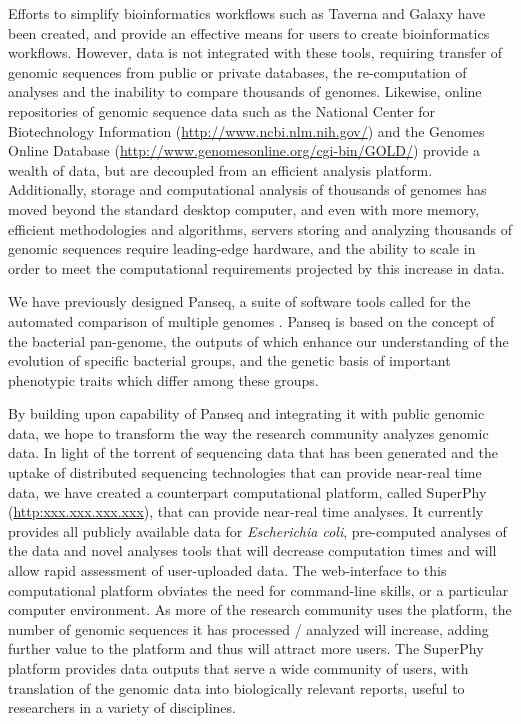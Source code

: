 \documentclass[a4paper,twoside]{article}
\begin{document}
Efforts to simplify bioinformatics workflows such as Taverna \cite{lanzen_taverna_2008} and Galaxy \cite{goecks_galaxy:_2010} have been created, and provide an effective means for users to create bioinformatics workflows. However, data is not integrated with these tools, requiring transfer of genomic sequences from public or private databases, the re-computation of analyses and the inability to compare thousands of genomes. Likewise, online repositories of genomic sequence data such as the National Center for Biotechnology Information (\url{http://www.ncbi.nlm.nih.gov/}) and the Genomes Online Database (\url{http://www.genomesonline.org/cgi-bin/GOLD/}) 
provide a wealth of data, but are decoupled from an efficient analysis platform. Additionally, storage and computational analysis of thousands of genomes has moved beyond the standard desktop computer, and even with more memory, efficient methodologies and algorithms, servers storing and analyzing thousands of genomic sequences require leading-edge hardware, and the ability to scale in order to meet the computational requirements projected by this increase in data.

We have previously designed Panseq, a suite of software tools called for the automated comparison of multiple genomes \cite{laing_pan-genome_2010,laing_identification_2011}. Panseq is based on the concept of the bacterial pan-genome, the outputs of which enhance our understanding of the evolution of specific bacterial groups, and the genetic basis of important phenotypic traits which differ among these groups.

By building upon capability of Panseq and integrating it with public genomic data, we hope to transform the way the research community analyzes genomic data. In light of the torrent of sequencing data that has been generated and the uptake of distributed sequencing technologies that can provide near-real time data, we have created a counterpart computational platform, called SuperPhy (\url{http:xxx.xxx.xxx.xxx}), that can provide near-real time analyses. It currently provides all publicly available data for \textit{Escherichia coli}, pre-computed analyses of the data and novel analyses tools that will decrease computation times and will allow rapid assessment of user-uploaded data. The web-interface to this computational platform obviates the need for command-line skills, or a particular computer environment. As more of the research community uses the platform, the number of genomic sequences it has processed / analyzed will increase, adding further value to the platform and thus will attract more users. The SuperPhy platform provides data outputs that serve a wide community of users, with translation of the genomic data into biologically relevant reports, useful to researchers in a variety of disciplines.
\end{document}
